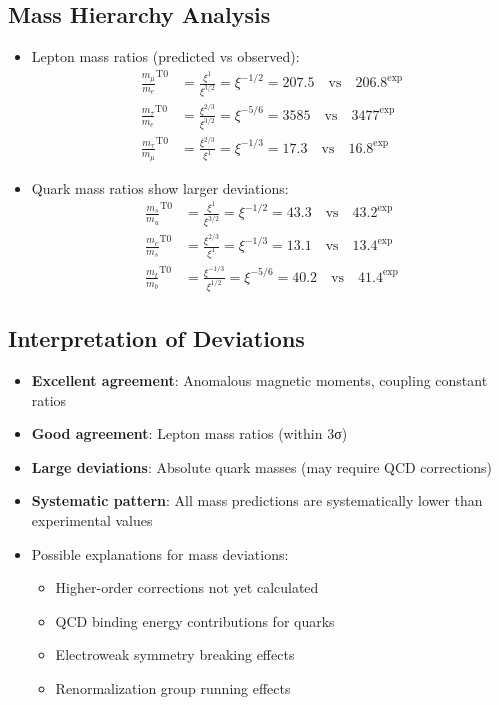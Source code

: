 \documentclass[12pt,a4paper]{article}
\begin{document}
\subsection{Mass Hierarchy Analysis}
\begin{itemize}
	\item Lepton mass ratios (predicted vs observed):
	\begin{align}
		\frac{m_\mu}{m_e}^{\text{T0}} &= \frac{\xi^1}{\xi^{3/2}} = \xi^{-1/2} = 207.5 \quad \text{vs} \quad 206.8^{\text{exp}} \\
		\frac{m_\tau}{m_e}^{\text{T0}} &= \frac{\xi^{2/3}}{\xi^{3/2}} = \xi^{-5/6} = 3585 \quad \text{vs} \quad 3477^{\text{exp}} \\
		\frac{m_\tau}{m_\mu}^{\text{T0}} &= \frac{\xi^{2/3}}{\xi^1} = \xi^{-1/3} = 17.3 \quad \text{vs} \quad 16.8^{\text{exp}}
	\end{align}
	
	\item Quark mass ratios show larger deviations:
	\begin{align}
		\frac{m_s}{m_u}^{\text{T0}} &= \frac{\xi^1}{\xi^{3/2}} = \xi^{-1/2} = 43.3 \quad \text{vs} \quad 43.2^{\text{exp}} \\
		\frac{m_c}{m_s}^{\text{T0}} &= \frac{\xi^{2/3}}{\xi^1} = \xi^{-1/3} = 13.1 \quad \text{vs} \quad 13.4^{\text{exp}} \\
		\frac{m_t}{m_b}^{\text{T0}} &= \frac{\xi^{-1/3}}{\xi^{1/2}} = \xi^{-5/6} = 40.2 \quad \text{vs} \quad 41.4^{\text{exp}}
	\end{align}
\end{itemize}

\subsection{Interpretation of Deviations}
\begin{itemize}
	\item \textbf{Excellent agreement}: Anomalous magnetic moments, coupling constant ratios
	\item \textbf{Good agreement}: Lepton mass ratios (within 3σ)
	\item \textbf{Large deviations}: Absolute quark masses (may require QCD corrections)
	\item \textbf{Systematic pattern}: All mass predictions are systematically lower than experimental values
	
	\item Possible explanations for mass deviations:
	\begin{itemize}
		\item Higher-order corrections not yet calculated
		\item QCD binding energy contributions for quarks
		\item Electroweak symmetry breaking effects
		\item Renormalization group running effects
	\end{itemize}
\end{itemize}
\end{document}
